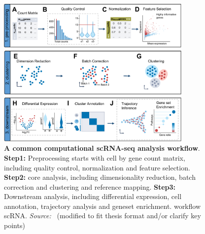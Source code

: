 \begin{figure}[!ht]
	\centering
	\includegraphics[width=0.85\textwidth]{workflow_scRNA/fig}
	\vspace{0.1cm}
	\caption[A common computational scRNA-seq analysis workflow]{
		\textbf{A common computational scRNA-seq analysis workflow}.
		\textbf{Step1:} Preprocessing starts with cell by gene count matrix, including quality control, normalization and feature selection.
		\textbf{Step2:} core analysis, including dimensionality reduction, batch correction and clustering and reference mapping.
		\textbf{Step3:} Downstream analysis, including differential expression, cell annotation, trajectory analysis and geneset enrichment.
	workflow scRNA. \emph{Source:~\cite{heumos2023best}} (modified to fit thesis format and/or clarify key points)}
	\label{fig:workflow_scRNA}
\end{figure}

